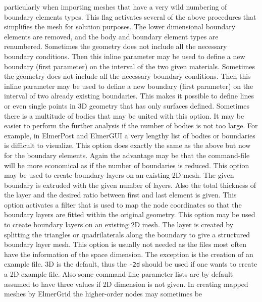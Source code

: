 particularly when importing meshes that have a very wild numbering of boundary elements types.
%
This flag activates several of the above procedures that simplifies the mesh
for solution purposes. The lower dimensional boundary elements are removed, 
and the body and boundary element types are renumbered.
%
Sometimes the geometry does not include all the necessary boundary conditions. 
Then this inline parameter may be used to define a new boundary 
(first parameter) on the interval of the two given materials.
%
Sometimes the geometry does not include all the necessary boundary conditions. 
Then this inline parameter may be used to define a new boundary 
(first parameter) on the interval of two already existing boundaries.
This makes it possible to define lines or even single points 
in 3D geometry that has only surfaces defined.
%
Sometimes there is a multitude of bodies that may be united with this option.
It may be easier to perform the further analysis if the number of bodies 
is not too large.
For example, in ElmerPost and ElmerGUI a very lengthy list of bodies or 
boundaries is difficult to visualize. 
%
This option does exactly the same as the above but now for the boundary
 elements.
Again the advantage may be that the command-file will be more economical as 
if the number of boundaries is reduced.
%
This option may be used to create boundary layers on an existing 2D mesh.
The given boundary is extruded with the given number of layers. Also the total
thickness of the layer and the desired ratio between first and last element
is given.
%
This option activates a filter that is used to map the node coordinates 
so that the boundary layers are fitted within the original geometry.
%
This option may be used to create boundary layers on an existing 2D mesh.
The layer is created by splitting the triangles or quadrilaterals 
along the boundary to give a structured boundary layer mesh.
%
This option is usually not needed as the files most often have the information
of the space dimension. The exception is the creation of an example file.
3D is the default, thus the \texttt{-2d} should be used if one wants to create
a 2D example file. Also some command-line parameter lists are by default assumed to have 
three values if 2D dimension is not given.
%
In creating mapped meshes by ElmerGrid the higher-order nodes may sometimes be 
